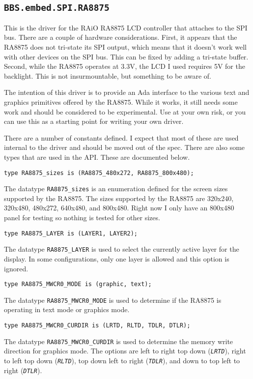 \documentclass[10pt, openany]{book}
\newcommand{\package}[1]{\texttt{#1}}
\newcommand{\constant}[1]{\emph{\texttt{#1}}}
\newcommand{\datatype}[1]{\texttt{#1}}
\begin{document}
\subsection{\package{BBS.embed.SPI.RA8875}}
This is the driver for the RAiO RA8875 LCD controller that attaches to the SPI bus\cite{RA8875}.  There are a couple of hardware considerations.  First, it appears that the RA8875 does not tri-state its SPI output, which means that it doesn't work well with other devices on the SPI bus.  This can be fixed by adding a tri-state buffer.  Second, while the RA8875 operates at 3.3V, the LCD I used requires 5V for the backlight.  This is not insurmountable, but something to be aware of.

The intention of this driver is to provide an Ada interface to the various text and graphics primitives offered by the RA8875.  While it works, it still needs some work and should be considered to be experimental.  Use at your own risk, or you can use this as a starting point for writing your own driver.

There are a number of constants defined.  I expect that most of these are used internal to the driver and should be moved out of the spec.  There are also some types that are used in the API.  These are documented below.

\begin{lstlisting}
type RA8875_sizes is (RA8875_480x272, RA8875_800x480);
\end{lstlisting}
The datatype \datatype{RA8875\_sizes} is an enumeration defined for the screen sizes supported by the RA8875.  The sizes supported by the RA8875 are 320x240, 320x480, 480x272, 640x480, and 800x480.  Right now I only have an 800x480 panel for testing so nothing is tested for other sizes.

\begin{lstlisting}
type RA8875_LAYER is (LAYER1, LAYER2);
\end{lstlisting}
The datatype \datatype{RA8875\_LAYER} is used to select the currently active layer for the display.  In some configurations, only one layer is allowed and this option is ignored.

\begin{lstlisting}
type RA8875_MWCR0_MODE is (graphic, text);
\end{lstlisting}
The datatype \datatype{RA8875\_MWCR0\_MODE} is used to determine if the RA8875 is operating in text mode or graphics mode.

\begin{lstlisting}
type RA8875_MWCR0_CURDIR is (LRTD, RLTD, TDLR, DTLR);
\end{lstlisting}
The datatype \datatype{RA8875\_MWCR0\_CURDIR} is used to determine the memory write direction for graphics mode.  The options are left to right top down (\constant{LRTD}), right to left top down (\constant{RLTD}), top down left to right (\constant{TDLR}), and down to top left to right (\constant {DTLR}).
\end{document}
